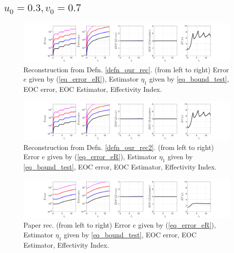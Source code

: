 \documentclass[12pt,a4paper]{article}
\numberwithin{equation}{section}
\theoremstyle{definition}
\begin{document}
\subsection*{$u_0=0.3, v_0= 0.7$}
\begin{figure}[H]
	\hspace{-3cm}
	\includegraphics[scale=0.55]{fig_LeapFrogplots_1x5_sin_IC_harmonic_order_2_u3_v7_rec_george}	
	\caption{Reconstruction from Defn. \ref{defn_our_rec}. (from left to right) Error $e$ given by (\ref{eq_error_eR}), Estimator $\eta_1$ given by \ref{eq_bound_test},   EOC error, EOC Estimator, Effectivity Index.}
	\label{fig_all_in_one_our_rec_george_u3_v7}
\end{figure}
\begin{figure}[H]
	\hspace{-3cm}
	\includegraphics[scale=0.55]{fig_LeapFrogplots_1x5_sin_IC_harmonic_order_2_u3_v7_rec2}	
	\caption{Reconstruction from Defn. \ref{defn_our_rec2}. (from left to right) Error $e$ given by (\ref{eq_error_eR}), Estimator $\eta_1$ given by \ref{eq_bound_test},  EOC error, EOC Estimator, Effectivity Index.}
	\label{fig_all_in_one_our_rec_2_u3_v7}
\end{figure}
\begin{figure}[H]
	\hspace{-3cm}
	\includegraphics[scale=0.55]{fig_LeapFrogplots_1x5_sin_IC_harmonic_u3_v7_paperrec}	
	\caption{Paper rec. (from left to right) Error $e$ given by (\ref{eq_error_eR}), Estimator $\eta_1$ given by \ref{eq_bound_test}, EOC error, EOC Estimator, Effectivity Index.}
	\label{fig_all_in_one_paperrec_u03_v07}
\end{figure}
\end{document}
